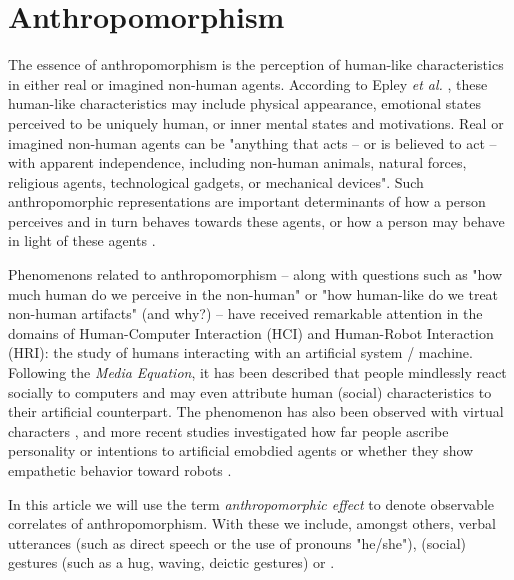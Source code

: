 \documentclass{acm_proc_article-sp}
\begin{document}


\section{Anthropomorphism}
\label{sec:intro}


The essence of anthropomorphism is the perception of human-like characteristics
in either real or imagined non-human agents. According to Epley \textit{et al.}
\cite{epley_when_2008}, these human-like characteristics may include physical
appearance, emotional states perceived to be uniquely human, or inner mental
states and motivations. Real or imagined non-human agents can be "anything that
acts -- or is believed to act -- with apparent independence, including
non-human animals, natural forces, religious agents, technological gadgets, or
mechanical devices". Such anthropomorphic representations are important
determinants of how a person perceives and in turn behaves towards these
agents, or how a person may behave in light of these agents
\cite{epley_when_2008}.

	
Phenomenons related to anthropomorphism -- along with questions such as "how
much human do we perceive in the non-human" or "how human-like do we treat
non-human artifacts" (and why?) -- have received remarkable attention in the
domains of Human-Computer Interaction (HCI) and Human-Robot Interaction (HRI):
the study of humans interacting with an artificial system / machine. Following
the \textit{Media Equation}, it has been described that people mindlessly react
socially to computers \cite{reeves_media_1996} and may even attribute human
(social) characteristics to their artificial counterpart. The phenomenon has
also been observed with virtual characters , and more recent studies investigated how
far people ascribe personality or intentions to artificial emobdied agents or
whether they show empathetic behavior toward robots
\cite{rosenthal-vonderputten_experimental_2013}. 

In this article we will use the term \emph{anthropomorphic effect} to denote
observable correlates of anthropomorphism. With these we include, amongst
others, verbal utterances (such as direct speech or the use of pronouns
"he/she"), (social) gestures (such as a hug, waving, deictic gestures) or
.
\end{document}
